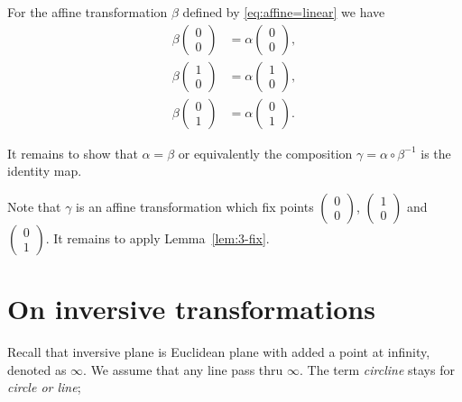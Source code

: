 For the affine transformation $\beta$ defined by \ref{eq:affine=linear}
we have 
\begin{align*}
\beta\left(\begin{smallmatrix}
0\\ 0
\end{smallmatrix} \right)
&=
\alpha\left(\begin{smallmatrix}
0\\ 0
\end{smallmatrix} \right),
\\
\beta\left(\begin{smallmatrix}
1\\ 0
\end{smallmatrix} \right)
&=
\alpha\left(\begin{smallmatrix}
1\\ 0
\end{smallmatrix} \right),
\\
\beta\left(\begin{smallmatrix}
0\\ 1
\end{smallmatrix} \right)
&=
\alpha\left(\begin{smallmatrix}
0\\ 1
\end{smallmatrix} \right).
\end{align*}


It remains to show that $\alpha=\beta$ or equivalently the composition $\gamma=\alpha\circ \beta^{-1}$ is the identity map.

Note that $\gamma$ is an affine transformation which fix points $\left(\begin{smallmatrix}
0\\ 0
\end{smallmatrix} \right)$, 
$\left(\begin{smallmatrix}
1\\ 0
\end{smallmatrix} \right)$ 
and $\left(\begin{smallmatrix}
0\\ 1
\end{smallmatrix} \right)$.
It remains to apply Lemma~\ref{lem:3-fix}.
\qeds

\section*{On inversive transformations}


Recall that inversive plane is Euclidean plane with added a point at infinity, denoted as $\infty$.
We assume that any line pass thru $\infty$.
The term {}\emph{circline} stays for {}\emph{circle or line};

